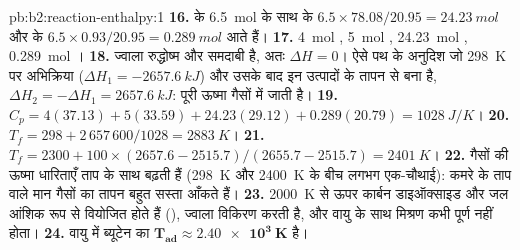 \begin{solution}{pb:b2:reaction-enthalpy:1}
\textbf{16.}  के \qty{6.5}{mol} के साथ  के $6.5 \times 78.08/20.95 =
\qty{24.23}{mol}$ और  के $6.5 \times 0.93/20.95 = \qty{0.289}{mol}$
आते हैं।
\textbf{17.} \qty{4}{mol} , \qty{5}{mol} ,
\qty{24.23}{mol} , \qty{0.289}{mol} ।
\textbf{18.} ज्वाला रुद्धोष्म और समदाबी है, अतः $\Delta H = 0$। ऐसे
पथ के अनुदिश जो \qty{298}{K} पर अभिक्रिया ($\Delta H_1 =
\qty{-2657.6}{kJ}$) और उसके बाद इन उत्पादों के तापन से बना है, $\Delta H_2 =
-\Delta H_1 = \qty{+2657.6}{kJ}$: पूरी ऊष्मा गैसों में जाती है।
\textbf{19.} $C_p = 4(37.13) + 5(33.59) + 24.23(29.12) + 0.289(20.79) =
\qty{1028}{J/K}$।
\textbf{20.} $T_f = 298 + 2\,657\,600/1028 = \qty{2883}{K}$।
\textbf{21.} $T_f = 2300 + 100 \times (2657.6 - 2515.7)/(2655.7 - 2515.7) =
\qty{2401}{K}$।
\textbf{22.} गैसों की ऊष्मा धारिताएँ ताप के साथ बढ़ती हैं (\qty{298}{K} और
\qty{2400}{K} के बीच लगभग एक-चौथाई): कमरे के ताप वाले
मान गैसों का तापन बहुत सस्ता आँकते हैं।
\textbf{23.} \qty{2000}{K} से ऊपर कार्बन डाइऑक्साइड और जल आंशिक रूप से वियोजित होते हैं
(), ज्वाला विकिरण करती है, और वायु के साथ मिश्रण कभी पूर्ण नहीं होता।
\textbf{24.} वायु में ब्यूटेन का 
$\boldsymbol{T_{\text{ad}} \approx \qty{2.40e3}{K}}$ है।
\end{solution}
